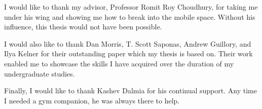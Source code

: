 I would like to thank my advisor, Professor Romit Roy Choudhury, for taking me under his wing and showing me how to break into the mobile space. Without his influence, this thesis would not have been possible.

I would also like to thank Dan Morris, T. Scott Saponas, Andrew Guillory, and Ilya Kelner for their outstanding paper which my thesis is based on. Their work enabled me to showcase the skills I have acquired over the duration of my undergraduate studies.

Finally, I would like to thank Kashev Dalmia for his continual support. Any time I needed a gym companion, he was always there to help. 
